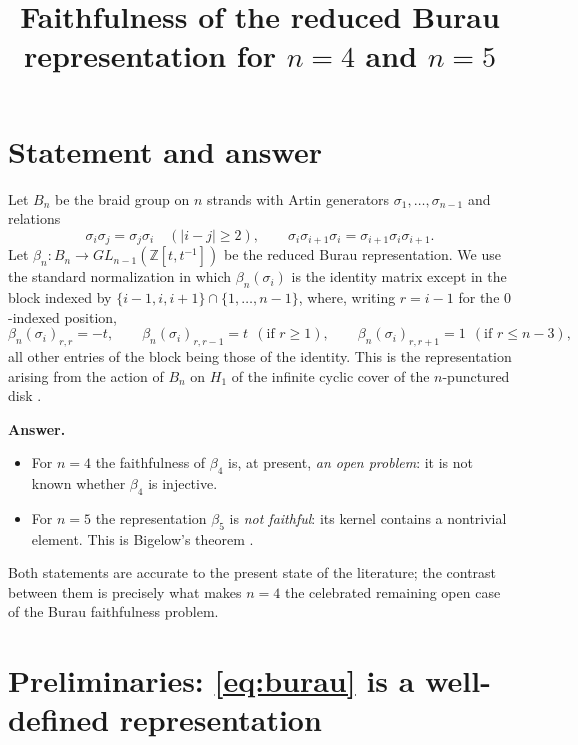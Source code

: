 \documentclass{amsart}
\theoremstyle{remark}
\begin{document}
\title{Faithfulness of the reduced Burau representation for $n=4$ and $n=5$}
\maketitle

\section*{Statement and answer}

Let $B_n$ be the braid group on $n$ strands with Artin generators
$\sigma_1,\dots,\sigma_{n-1}$ and relations
\[
\sigma_i\sigma_j=\sigma_j\sigma_i \quad(|i-j|\ge 2),\qquad
\sigma_i\sigma_{i+1}\sigma_i=\sigma_{i+1}\sigma_i\sigma_{i+1}.
\]
Let $\beta_n:B_n\to GL_{n-1}(\mathbb Z[t,t^{-1}])$ be the reduced Burau
representation. We use the standard normalization in which $\beta_n(\sigma_i)$
is the identity matrix except in the block indexed by
$\{i-1,i,i+1\}\cap\{1,\dots,n-1\}$, where, writing $r=i-1$ for the $0$-indexed
position,
\begin{equation}\label{eq:burau}
\beta_n(\sigma_i)_{r,r}=-t,\qquad
\beta_n(\sigma_i)_{r,r-1}=t \ \ (\text{if }r\ge 1),\qquad
\beta_n(\sigma_i)_{r,r+1}=1 \ \ (\text{if }r\le n-3),
\end{equation}
all other entries of the block being those of the identity. This is the
representation arising from the action of $B_n$ on $H_1$ of the infinite
cyclic cover of the $n$-punctured disk \cite[\S3.3]{KasselTuraev}.

\medskip
\noindent\textbf{Answer.}
\begin{itemize}
\item[(a)] For $n=4$ the faithfulness of $\beta_4$ is, at present,
\emph{an open problem}: it is not known whether $\beta_4$ is injective.
\item[(b)] For $n=5$ the representation $\beta_5$ is \emph{not faithful}:
its kernel contains a nontrivial element. This is Bigelow's theorem
\cite{Bigelow1999}.
\end{itemize}

\noindent
Both statements are accurate to the present state of the literature; the
contrast between them is precisely what makes $n=4$ the celebrated remaining
open case of the Burau faithfulness problem.

\section{Preliminaries: \texorpdfstring{\eqref{eq:burau}}{(1)} is a well-defined representation}
\end{document}

